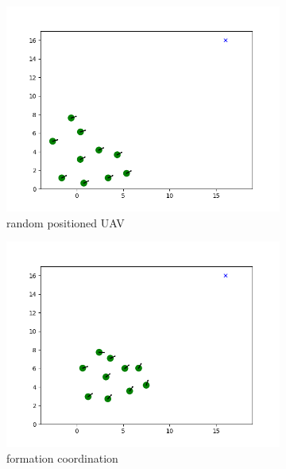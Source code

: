 \begin{figure}[htbp]
     \centering
     \begin{subfigure}[b]{0.3\textwidth}
         \centering
         \includegraphics[width=\textwidth]{figures/reconfigure_1.png}
         \caption{random positioned UAV}
         \label{before merging}
     \end{subfigure}
     \hfill
     \begin{subfigure}[b]{0.3\textwidth}
         \centering
         \includegraphics[width=\textwidth]{figures/reconfigure_2.png}
         \caption{formation coordination}
         \label{ew}
     \end{subfigure}
     \hfill
     \begin{subfigure}[b]{0.3\textwidth}

\end{subfigure}
\end{figure}
